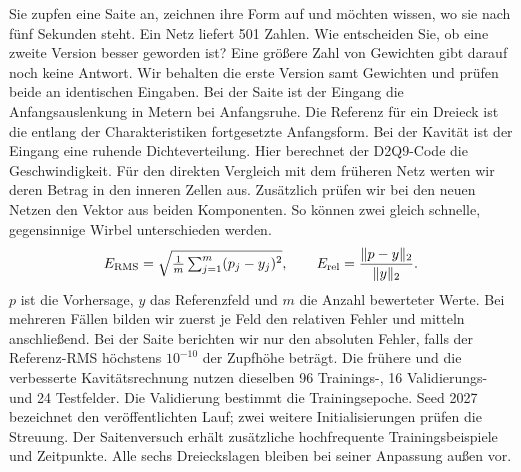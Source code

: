Sie zupfen eine Saite an, zeichnen ihre Form auf und möchten wissen, wo sie nach fünf Sekunden steht. Ein Netz liefert 501 Zahlen. Wie entscheiden Sie, ob eine zweite Version besser geworden ist? Eine größere Zahl von Gewichten gibt darauf noch keine Antwort. Wir behalten die erste Version samt Gewichten und prüfen beide an identischen Eingaben.
Bei der Saite ist der Eingang die Anfangsauslenkung in Metern bei Anfangsruhe. Die Referenz für ein Dreieck ist die entlang der Charakteristiken fortgesetzte Anfangsform. Bei der Kavität ist der Eingang eine ruhende Dichteverteilung. Hier berechnet der D2Q9-Code die Geschwindigkeit. Für den direkten Vergleich mit dem früheren Netz werten wir deren Betrag in den inneren Zellen aus. Zusätzlich prüfen wir bei den neuen Netzen den Vektor aus beiden Komponenten. So können zwei gleich schnelle, gegensinnige Wirbel unterschieden werden.
\[
 E_{\rm RMS}=\sqrt{\tfrac1m\textstyle\sum_{j=1}^m(p_j-y_j)^2},
 \qquad E_{\rm rel}=\frac{\|p-y\|_2}{\|y\|_2}.
\]
\(p\) ist die Vorhersage, \(y\) das Referenzfeld und \(m\) die Anzahl bewerteter Werte. Bei mehreren Fällen bilden wir zuerst je Feld den relativen Fehler und mitteln anschließend. Bei der Saite berichten wir nur den absoluten Fehler, falls der Referenz-RMS höchstens \(10^{-10}\) der Zupfhöhe beträgt.
Die frühere und die verbesserte Kavitätsrechnung nutzen dieselben 96 Trainings-, 16 Validierungs- und 24 Testfelder. Die Validierung bestimmt die Trainingsepoche. Seed 2027 bezeichnet den veröffentlichten Lauf; zwei weitere Initialisierungen prüfen die Streuung. Der Saitenversuch erhält zusätzliche hochfrequente Trainingsbeispiele und Zeitpunkte. Alle sechs Dreieckslagen bleiben bei seiner Anpassung außen vor.

